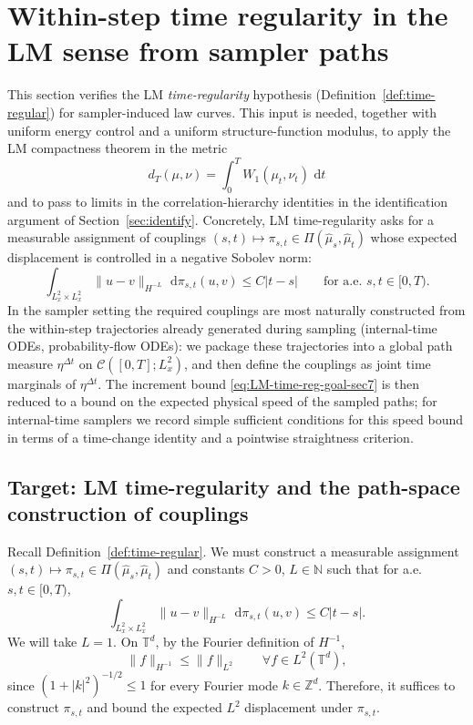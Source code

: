 \documentclass{article}
\numberwithin{equation}{section}
\theoremstyle{plain}
\theoremstyle{definition}
\theoremstyle{remark}
\newcommand{\N}{\mathbb{N}}
\newcommand{\T}{\mathbb{T}}
\newcommand{\Ccal}{\mathcal{C}}
\newcommand{\dd}{\,\mathrm{d}}
\newcommand{\Z}{\mathbb{Z}}
\begin{document}
\section{Within-step time regularity in the LM sense from sampler paths}
\label{sec:regularity}

This section verifies the LM \emph{time-regularity} hypothesis (Definition~\ref{def:time-regular}) for sampler-induced law
curves. This input is needed, together with uniform energy control and a uniform structure-function modulus, to apply the
LM compactness theorem in the metric
\[
d_T(\mu,\nu)=\int_0^T W_1(\mu_t,\nu_t)\,\dd t
\]
and to pass to limits in the correlation-hierarchy identities in the identification argument of
Section~\ref{sec:identify}. Concretely, LM time-regularity asks for a measurable assignment of couplings
$(s,t)\mapsto \pi_{s,t}\in\Pi(\widehat\mu_s,\widehat\mu_t)$ whose expected displacement is controlled in a negative Sobolev
norm:
\begin{equation}\label{eq:LM-time-reg-goal-sec7}
\int_{L^2_x\times L^2_x}\|u-v\|_{H^{-L}}\,\dd\pi_{s,t}(u,v)\le C|t-s|
\qquad\text{for a.e.\ }s,t\in[0,T).
\end{equation}
In the sampler setting the required couplings are most naturally constructed from the within-step trajectories already
generated during sampling (internal-time ODEs, probability-flow ODEs): we package these trajectories into a global path
measure $\eta^{\Delta t}$ on $\Ccal([0,T];L^2_x)$, and then define the couplings as joint time marginals of
$\eta^{\Delta t}$. The increment bound \eqref{eq:LM-time-reg-goal-sec7} is then reduced to a bound on the expected physical
speed of the sampled paths; for internal-time samplers we record simple sufficient conditions for this speed bound in
terms of a time-change identity and a pointwise straightness criterion.

\subsection{Target: LM time-regularity and the path-space construction of couplings}

Recall Definition~\ref{def:time-regular}. We must construct a measurable assignment
$(s,t)\mapsto \pi_{s,t}\in\Pi(\widehat\mu_s,\widehat\mu_t)$ and constants $C>0$, $L\in\N$ such that for a.e.\ $s,t\in[0,T)$,
\begin{equation}\label{eq:LM-time-reg-goal-again-sec7}
\int_{L^2_x\times L^2_x}\|u-v\|_{H^{-L}}\,\dd\pi_{s,t}(u,v)\le C|t-s|.
\end{equation}
We will take $L=1$. On $\T^d$, by the Fourier definition of $H^{-1}$,
\begin{equation}\label{eq:Hminus1-le-L2-secReg}
\|f\|_{H^{-1}}\le \|f\|_{L^2}\qquad\forall f\in L^2(\T^d),
\end{equation}
since $(1+|k|^2)^{-1/2}\le 1$ for every Fourier mode $k\in\Z^d$.
Therefore, it suffices to construct $\pi_{s,t}$ and bound the expected $L^2$ displacement under $\pi_{s,t}$.
\end{document}

